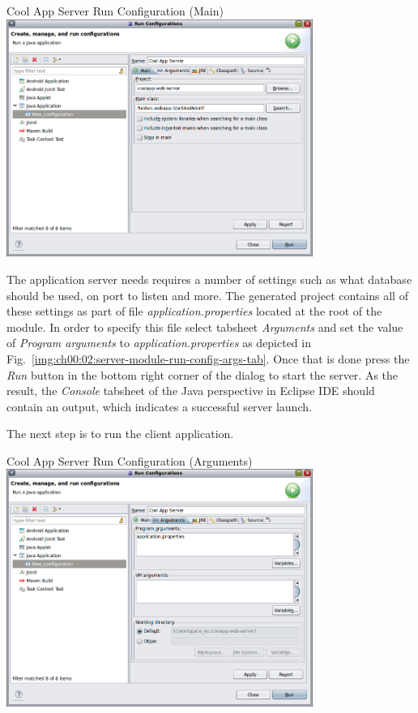   \begin{image}{Cool App Server Run Configuration (Main)}{\label{img:ch00:02:server-module-run-config-main-tab}}    
    \includegraphics[width=0.75\textwidth]{parts/00-part/chapters/01-application-modules/images/13-server-module-run-config-main-tab.png}
  \end{image}

  The application server needs requires a number of settings such as what database should be used, on port to listen and more.
  The generated project contains all of these settings as part of file \emph{application.properties} located at the root of the module.
  In order to specify this file select tabsheet \emph{Arguments} and set the value of \emph{Program arguments} to \emph{application.properties} as depicted in Fig.~\ref{img:ch00:02:server-module-run-config-args-tab}.
  Once that is done press the \emph{Run} button in the bottom right corner of the dialog to start the server.
  As the result, the \emph{Console} tabsheet of the Java perspective in Eclipse IDE should contain an output, which indicates a successful server launch.
  
  The next step is to run the client application.

  \begin{image}{Cool App Server Run Configuration (Arguments)}{\label{img:ch00:02:server-module-run-config-args-tab}}    
    \includegraphics[width=0.75\textwidth]{parts/00-part/chapters/01-application-modules/images/14-server-module-run-config-arguments-tab.png}
  \end{image}
  

